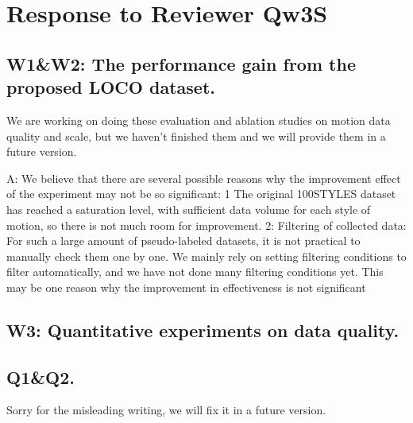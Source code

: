 \documentclass{article}
\begin{document}






\section{Response to Reviewer Qw3S}

\subsection{W1\&W2: The performance gain from the proposed LOCO dataset.} 

We are working on doing these evaluation and ablation studies on motion data quality and scale, but we haven't finished them and we will provide them in a future version.

A: We believe that there are several possible reasons why the improvement effect of the experiment may not be so significant: 1 The original 100STYLES dataset has reached a saturation level, with sufficient data volume for each style of motion, so there is not much room for improvement. 2: Filtering of collected data: For such a large amount of pseudo-labeled datasets, it is not practical to manually check them one by one. We mainly rely on setting filtering conditions to filter automatically, and we have not done many filtering conditions yet. This may be one reason why the improvement in effectiveness is not significant

\subsection{W3: Quantitative experiments on data quality.}

\subsection{Q1\&Q2.} Sorry for the misleading writing, we will fix it in a future version.
\end{document}
